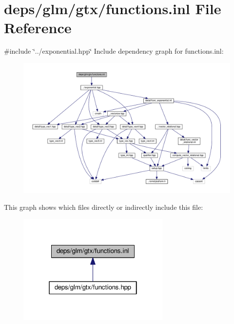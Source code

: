 \hypertarget{functions_8inl}{}\section{deps/glm/gtx/functions.inl File Reference}
\label{functions_8inl}
{\ttfamily \#include \char`\"{}../exponential.\+hpp\char`\"{}}\newline
Include dependency graph for functions.\+inl\+:
\nopagebreak
\begin{figure}[H]
\begin{center}
\leavevmode
\includegraphics[width=350pt]{db/d97/functions_8inl__incl}
\end{center}
\end{figure}
This graph shows which files directly or indirectly include this file\+:
\nopagebreak
\begin{figure}[H]
\begin{center}
\leavevmode
\includegraphics[width=214pt]{df/df4/functions_8inl__dep__incl}
\end{center}
\end{figure}
